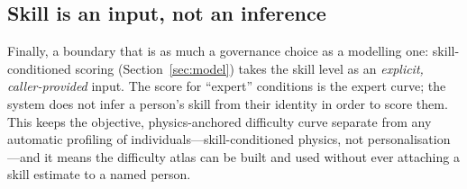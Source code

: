 \subsection{Skill is an input, not an inference}

Finally, a boundary that is as much a governance choice as a modelling one:
skill-conditioned scoring (Section~\ref{sec:model}) takes the skill level as an
\emph{explicit, caller-provided} input. The score for ``expert'' conditions is the
expert curve; the system does not infer a person's skill from their identity in
order to score them. This keeps the objective, physics-anchored difficulty curve
separate from any automatic profiling of individuals---skill-conditioned physics,
not personalisation---and it means the difficulty atlas can be built and used
without ever attaching a skill estimate to a named person.
